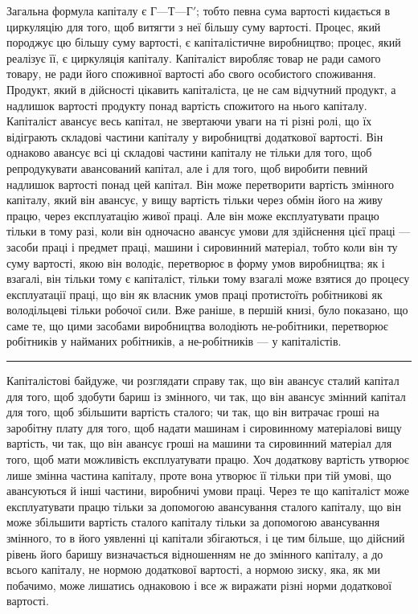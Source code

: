 Загальна формула капіталу є $Г — Т — Г'$; тобто певна сума
вартості кидається в циркуляцію для того, щоб витягти з неї
більшу суму вартості. Процес, який породжує цю більшу суму
вартості, є капіталістичне виробництво; процес, який реалізує
її, є циркуляція капіталу. Капіталіст виробляє товар не ради
самого товару, не ради його споживної вартості або свого особистого
споживання. Продукт, який в дійсності цікавить капіталіста,
це не сам відчутний продукт, а надлишок вартості продукту
понад вартість спожитого на нього капіталу. Капіталіст
авансує весь капітал, не звертаючи уваги на ті різні ролі, що їх
відіграють складові частини капіталу у виробництві додаткової
вартості. Він однаково авансує всі ці складові частини капіталу
не тільки для того, щоб репродукувати авансований капітал, але
і для того, щоб виробити певний надлишок вартості понад
цей капітал. Він може перетворити вартість змінного капіталу,
який він авансує, у вищу вартість тільки через обмін його на
живу працю, через експлуатацію живої праці. Але він може експлуатувати
працю тільки в тому разі, коли він одночасно авансує
умови для здійснення цієї праці — засоби праці і предмет
праці, машини і сировинний матеріал, тобто коли він ту суму
вартості, якою він володіє, перетворює в форму умов виробництва;
як і взагалі, він тільки тому є капіталіст, тільки тому взагалі
може взятися до процесу експлуатації праці, що він як власник
умов праці протистоїть робітникові як володільцеві тільки робочої
сили. Вже раніше, в першій книзі, було показано, що саме
те, що цими засобами виробництва володіють не-робітники, перетворює
робітників у найманих робітників, а не-робітників — у капіталістів.

\pfbreak

Капіталістові байдуже, чи розглядати справу так, що він
авансує сталий капітал для того, щоб здобути бариш із змінного,
чи так, що він авансує змінний капітал для того, щоб збільшити
вартість сталого; чи так, що він витрачає гроші на заробітну
плату для того, щоб надати машинам і сировинному матеріалові
вищу вартість, чи так, що він авансує гроші на машини та сировинний
матеріал для того, щоб мати можливість експлуатувати працю.
Хоч додаткову вартість утворює лише змінна частина капіталу,
проте вона утворює її тільки при тій умові, що авансуються
й інші частини, виробничі умови праці. Через те що капіталіст
може експлуатувати працю тільки за допомогою авансування сталого
капіталу, що він може збільшити вартість сталого капіталу
тільки за допомогою авансування змінного, то в його уявленні
ці капітали збігаються, і це тим більше, що дійсний рівень його
баришу визначається відношенням не до змінного капіталу, а
до всього капіталу, не нормою додаткової вартості, а нормою
зиску, яка, як ми побачимо, може лишатись однаковою і все ж
виражати різні норми додаткової вартості.

